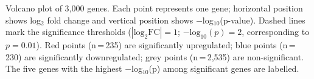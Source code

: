 \caption{Volcano plot of 3{,}000 genes. Each point represents one gene; horizontal position shows log$_2$ fold change and vertical position shows $-$log$_{10}$(p-value). Dashed lines mark the significance thresholds ($|\text{log}_2\text{FC}| = 1$; $-\text{log}_{10}(p) = 2$, corresponding to $p = 0.01$). Red points (n\,=\,235) are significantly upregulated; blue points (n\,=\,230) are significantly downregulated; grey points (n\,=\,2{,}535) are non-significant. The five genes with the highest $-$log$_{10}$(p) among significant genes are labelled.}
